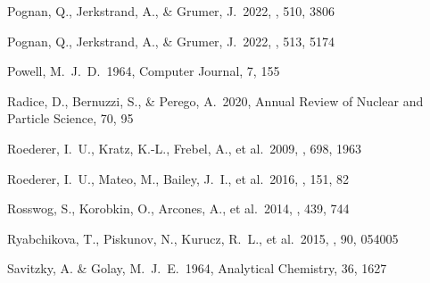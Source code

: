 \documentclass[twocolumn, twocolappendix]{aastex63}
\begin{document}
\begin{thebibliography}{}


 Pognan, Q., Jerkstrand, A., \& Grumer, J.\ 2022, \mnras, 510, 3806

 Pognan, Q., Jerkstrand, A., \& Grumer, J.\ 2022, \mnras, 513, 5174


 Powell, M.~J.~D.\ 1964, Computer Journal, 7, 155






 Radice, D., Bernuzzi, S., \& Perego, A.\ 2020, Annual Review of Nuclear and Particle Science, 70, 95


 Roederer, I.~U., Kratz, K.-L., Frebel, A., et al.\ 2009, \apj, 698, 1963


 Roederer, I.~U., Mateo, M., Bailey, J.~I., et al.\ 2016, \aj, 151, 82




 Rosswog, S., Korobkin, O., Arcones, A., et al.\ 2014, \mnras, 439, 744






 Ryabchikova, T., Piskunov, N., Kurucz, R.~L., et al.\ 2015, \physscr, 90, 054005




 Savitzky, A. \& Golay, M.~J.~E.\ 1964, Analytical Chemistry, 36, 1627



\end{thebibliography}
\end{document}

